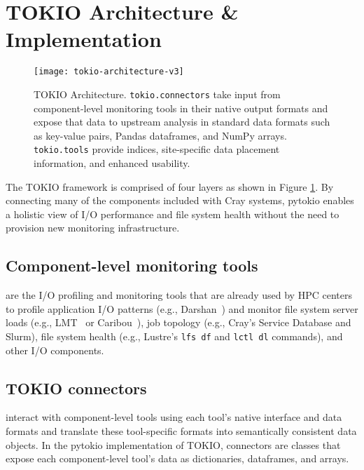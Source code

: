 \section{TOKIO Architecture \& Implementation} \label{sec:architecture}

\begin{figure}[t]
    \centering
    \texttt{[image: tokio-architecture-v3]}
    \vspace{-.3in}
    \caption{TOKIO Architecture.  \texttt{tokio.connectors} take input from component-level monitoring tools in their native output formats and expose that data to upstream analysis in standard data formats such as key-value pairs, Pandas dataframes, and NumPy arrays. \texttt{tokio.tools} provide indices, site-specific data placement information, and enhanced usability.}
    \label{fig:tokio-architecture}
    \vspace{-.2in}
\end{figure}


The TOKIO framework is comprised of four layers as shown in Figure \ref{fig:tokio-architecture}.  By connecting many of the components included with Cray systems, pytokio enables a holistic view of I/O performance and file system health without the need to provision new monitoring infrastructure.

\subsection{Component-level monitoring tools} \label{sec:architecture/components}

are the I/O profiling and monitoring tools that are already used by HPC centers to profile application I/O patterns (e.g., Darshan~\cite{Carns2009}) and monitor file system server loads (e.g., LMT~\cite{Keopp2014} or Caribou~\cite{Flaskerud2017}), job topology (e.g., Cray's Service Database and Slurm), file system health (e.g., Lustre's \texttt{lfs df} and \texttt{lctl dl} commands), and other I/O components.

\subsection{TOKIO connectors} \label{sec:architecture/connectors}

interact with component-level tools using each tool's native interface and data formats and translate these tool-specific formats into semantically consistent data objects.  In the pytokio implementation of TOKIO, connectors are classes that expose each component-level tool's data as dictionaries, dataframes, and arrays.


